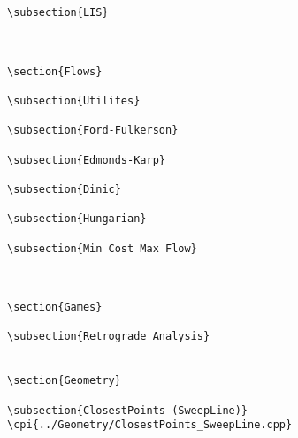 {\begin{verbatim}
\subsection{LIS}



\section{Flows}

\subsection{Utilites}

\subsection{Ford-Fulkerson}

\subsection{Edmonds-Karp}

\subsection{Dinic}

\subsection{Hungarian}

\subsection{Min Cost Max Flow}



\section{Games}

\subsection{Retrograde Analysis}


\section{Geometry}

\subsection{ClosestPoints (SweepLine)}
\cpi{../Geometry/ClosestPoints_SweepLine.cpp}

\end{verbatim}}
